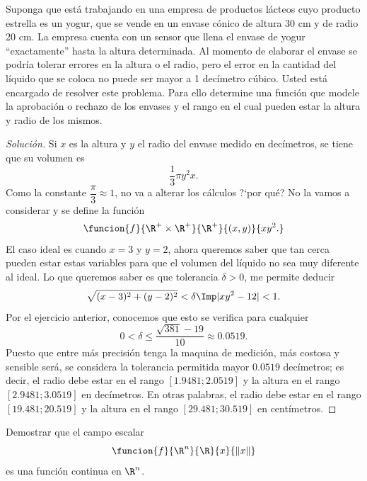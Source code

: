 \documentclass[a4,11pt]{aleph-notas}
\begin{document}
\encabezado

\begin{ejer}
Suponga que está trabajando en una empresa de productos lácteos cuyo producto estrella es un yogur, que se vende en un envase cónico de altura 30 cm y de radio 20 cm. La empresa cuenta con un sensor que llena el envase de yogur ``exactamente'' hasta la altura determinada. Al momento de elaborar el envase se podría tolerar errores en la altura o el radio, pero el error en la cantidad del líquido que se coloca no puede ser mayor a 1 decímetro cúbico. Usted está encargado de resolver este problema. Para ello determine una función que modele la aprobación o rechazo de los envases y el rango en el cual pueden estar la altura y radio de los mismos.
\end{ejer}

\begin{proof}[Solución]
Si $x$ es la altura y $y$ el radio del envase medido en decímetros, se tiene que su volumen es
    \[
        \dfrac{1}{3}\pi y^2 x.        
    \]
    Como la constante $\dfrac{\pi}{3}\approx 1$, no va a alterar los cálculos ?`por qué? No la vamos a considerar y se define la función
    \[
        \funcion{f}{\R^+\times \R^+}{\R^+}{(x,y)}{xy^2.}
    \]
    El caso ideal es cuando $x=3$ y $y=2$, ahora queremos saber que tan cerca pueden estar estas variables para que el volumen del líquido no sea muy diferente al ideal. Lo que queremos saber es que tolerancia $\delta >0$, me permite deducir
    \[
        \sqrt{(x-3)^2+(y-2)^2}<\delta \Imp |xy^2-12|<1.
    \]
    Por el ejercicio anterior, conocemos que esto se verifica para cualquier
    \[
        0<\delta \leq \dfrac{ \sqrt{381} - 19}{10}\approx 0.0519.
    \]
    Puesto que entre más precisión tenga la maquina de medición, más costosa y sensible será, se considera la tolerancia permitida mayor $0.0519$ decímetros; es decir, el radio debe estar en el rango $[1.9481;2.0519]$ y la altura en el rango $[2.9481;3.0519]$ en decímetros. En otras palabras, el radio debe estar en el rango $[19.481;20.519]$ y la altura en el rango $[29.481;30.519]$ en centímetros.
\end{proof}

\begin{ejer}
Demostrar que el campo escalar
	\[
		\funcion{f}{\R^n}{\R}{x}{\|x\|}
	\]
	es una función continua en $\R^n$.
\end{ejer}
\end{document}

